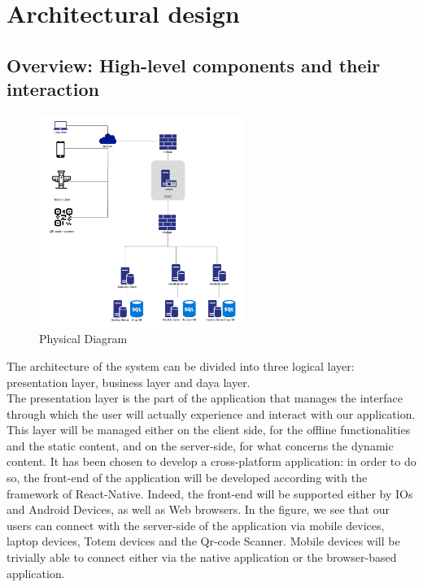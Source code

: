 \section{Architectural design}
\label{sect:overalldescription}

\subsection{Overview: High-level components and their interaction}
\label{subsect:Overview:Highlevelcomponentsandtheirinteraction}
\begin{figure}[h!]
    \centering
    \includegraphics[width=0.6\textwidth]{Images/PhysicalDiagram.png}
    \caption{\label{fig:PhysicalDiagram}{Physical Diagram}}
\end{figure}
The architecture of the system can be divided into three logical layer: presentation layer, business layer and daya layer.\\
The presentation layer is the part of the application that manages the interface through which the user will actually experience and interact with our application. 
This layer will be managed either on the client side, for the offline functionalities and the static content, and on the server-side, for what concerns the dynamic content. 
It has been chosen to develop a cross-platform application: in order to do so, the front-end of the application will be developed according with the framework of React-Native.
Indeed, the front-end will be supported either by IOs and Android Devices, as well as Web browsers.
 In the figure, we see that our users can connect with the server-side of the application via mobile devices, laptop devices, Totem devices and the Qr-code Scanner.
Mobile devices will be trivially able to connect either via the native application or the browser-based application.
